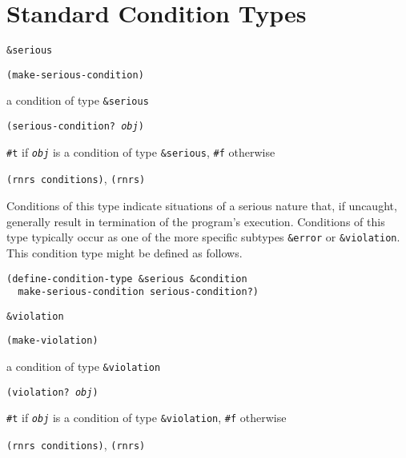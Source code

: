 \section{\label{exceptions_g150}\label{exceptions_h3}Standard Condition Types\label{exceptions_SECTEXCCONDTYPES}}


\begin{description}

\label{exceptions_s19}\item[syntax] \texttt{\&{}serious}



\item[procedure] \texttt{(make-serious-condition)}



\item[returns] a condition of type \texttt{\&{}serious}


\item[procedure] \texttt{(serious-condition? \textit{obj})}



\item[returns] \texttt{\#{}t} if \texttt{\textit{obj}} is a condition of type \texttt{\&{}serious}, \texttt{\#{}f} otherwise


\item[libraries] \texttt{(rnrs conditions)}, \texttt{(rnrs)}
\end{description}



Conditions of this type indicate situations
of a serious nature that, if uncaught, generally result in
termination of the program's execution.
Conditions of this type typically occur as one of the more
specific subtypes \texttt{\&{}error} or \texttt{\&{}violation}.
This condition type might be defined as follows.

\begin{alltt}
(define-condition-type \&{}serious \&{}condition
  make-serious-condition serious-condition?)
\end{alltt}

\begin{description}

\label{exceptions_s20}\item[syntax] \texttt{\&{}violation}



\item[procedure] \texttt{(make-violation)}



\item[returns] a condition of type \texttt{\&{}violation}


\item[procedure] \texttt{(violation? \textit{obj})}



\item[returns] \texttt{\#{}t} if \texttt{\textit{obj}} is a condition of type \texttt{\&{}violation}, \texttt{\#{}f} otherwise


\item[libraries] \texttt{(rnrs conditions)}, \texttt{(rnrs)}
\end{description}



